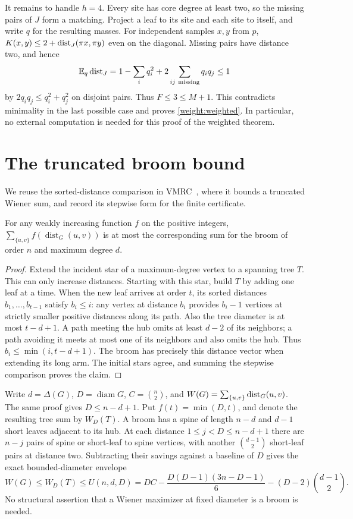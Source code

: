 It remains to handle $h=4$. Every site has core degree at least two, so the missing pairs of $J$ form a matching. Project a leaf to its site and each site to itself, and write $q$ for the resulting masses. For independent samples $x,y$ from $p$, $K(x,y)\le2+\operatorname{dist}_J(\pi x,\pi y)$ even on the diagonal. Missing pairs have distance two, and hence
\[
 \mathbb E_q\operatorname{dist}_J
 =1-\sum_i q_i^2+2\sum_{ij\ \mathrm{missing}}q_iq_j\le1
\]
by $2q_iq_j\le q_i^2+q_j^2$ on disjoint pairs. Thus $F\le3\le M+1$. This contradicts minimality in the last possible case and proves \eqref{weight:weighted}. In particular, no external computation is needed for this proof of the weighted theorem.

\section{The truncated broom bound}

We reuse the sorted-distance comparison in VMRC~\cite{VMRC244},
where it bounds a truncated Wiener sum, and record its stepwise
form for the finite certificate.
\begin{lemma}\label{low:broom}
For any weakly increasing function \(f\) on the positive integers,
\(\sum_{\{u,v\}} f(\operatorname{dist}_G(u,v))\) is at most the
corresponding sum for the broom of order \(n\) and maximum degree \(d\).
\end{lemma}
\begin{proof}
Extend the incident star of a maximum-degree vertex to a spanning
tree \(T\). This can only increase distances. Starting with this
star, build \(T\) by adding one leaf at a time. When the new leaf
arrives at order \(t\), its sorted distances \(b_1,\ldots,b_{t-1}\)
satisfy \(b_i\le i\): any vertex at distance \(b_i\) provides
\(b_i-1\) vertices at strictly smaller positive distances along its path.
Also the tree diameter is at most \(t-d+1\). A path meeting the hub
omits at least \(d-2\) of its neighbors; a path avoiding it meets at
most one of its neighbors and also omits the hub.
Thus \(b_i\le\min(i,t-d+1)\). The broom has precisely this distance
vector when extending its long arm. The initial stars agree, and
summing the stepwise comparison proves the claim.
\end{proof}

Write $d=\Delta(G)$, $D=\operatorname{diam} G$, $C=\binom n2$, and $W(G)=\sum_{\{u,v\}}\operatorname{dist}_G(u,v)$.
The same proof gives \(D\le n-d+1\). Put \(f(t)=\min(D,t)\), and denote
the resulting tree sum by \(W_D(T)\). A broom has a spine of length
\(n-d\) and \(d-1\) short leaves adjacent to its hub. At each distance
\(1\le j<D\le n-d+1\) there are \(n-j\) pairs of spine or short-leaf
to spine vertices, with another \(\binom{d-1}2\) short-leaf pairs at
distance two. Subtracting their savings against a baseline of \(D\)
gives the exact bounded-diameter envelope
\begin{equation}\label{low:boundW}
W(G)\le W_D(T)\le
 U(n,d,D)=DC-\frac{D(D-1)(3n-D-1)}6-(D-2)\binom{d-1}2.
\end{equation}
No structural assertion that a Wiener maximizer at fixed diameter is a
broom is needed.

